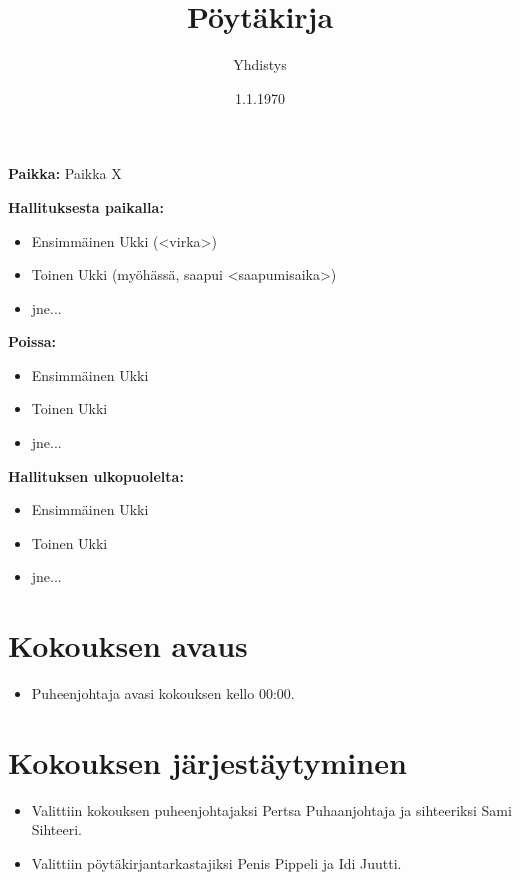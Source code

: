 \documentclass[finnish,12pt,a4paper]{article}
\newcommand{\ekatarkastaja}{Penis Pippeli}
\newcommand{\tokatarkastaja}{Idi Juutti}
\newcommand{\ekalaskija}{Eka Laskija}
\newcommand{\tokalaskija}{Toka Laskija}
\newcommand{\puhis}{Pertsa Puhaanjohtaja}
\newcommand{\sihteeri}{Sami Sihteeri}
\newcommand{\alkaa}{00:00}
\newcommand{\aika}{1.1.1970}
\newcommand{\paikka}{Paikka X}
\begin{document}
\title{Pöytäkirja}
\author{Yhdistys}
\date{\aika{}}
\maketitle


\begin {center}
\textbf{Paikka:} \paikka{}
\end{center}
\textbf{Hallituksesta paikalla:} 
\begin{itemize}
    \item Ensimmäinen Ukki (<virka>)
    \item Toinen Ukki (myöhässä, saapui <saapumisaika>)
    \item jne...
\end{itemize}
\textbf{Poissa:} 
\begin{itemize}
    \item Ensimmäinen Ukki
    \item Toinen Ukki
    \item jne...
\end{itemize}
\textbf{Hallituksen ulkopuolelta:} 
\begin{itemize}
    \item Ensimmäinen Ukki
    \item Toinen Ukki
    \item jne...
\end{itemize}

\section{Kokouksen avaus}
\begin{itemize}
    \item Puheenjohtaja avasi kokouksen kello \alkaa{}.
\end{itemize}

\section{Kokouksen järjestäytyminen}
\begin{itemize}
    \item Valittiin kokouksen puheenjohtajaksi \puhis{} ja sihteeriksi \sihteeri{}.
    \item Valittiin pöytäkirjantarkastajiksi \ekatarkastaja{} ja \tokatarkastaja{}.
\end{itemize}
\end{document}
